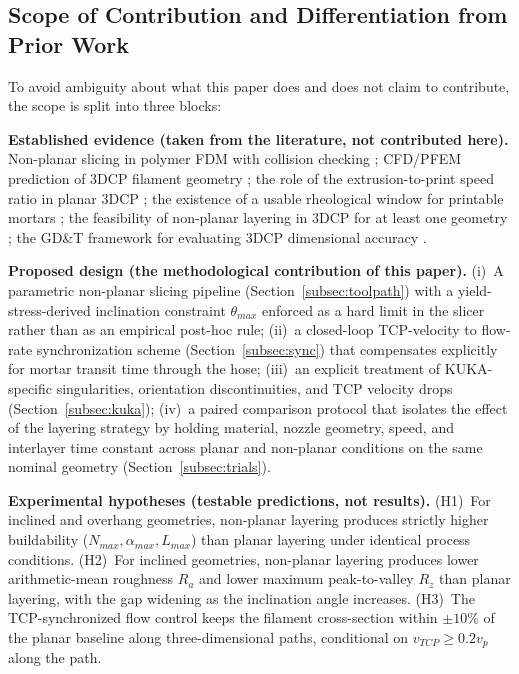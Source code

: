 \documentclass[conference]{IEEEtran}
\begin{document}
\subsection{Scope of Contribution and Differentiation from Prior Work}
\label{subsec:scope}

To avoid ambiguity about what this paper does and does not claim to contribute, the scope is split into three blocks:

\textbf{Established evidence (taken from the literature, not contributed here).} Non-planar slicing in polymer FDM with collision checking \cite{ahlers_3d_2019}; CFD/PFEM prediction of 3DCP filament geometry \cite{COMMINAL2020106256, reinold_extrusion_2022}; the role of the extrusion-to-print speed ratio in planar 3DCP \cite{foteinopoulos_cement-based_2020}; the existence of a usable rheological window for printable mortars \cite{bos_juxtaposing_2021, bao_testing_2024}; the feasibility of non-planar layering in 3DCP for at least one geometry \cite{vele_enhancing_2024}; the GD\&T framework for evaluating 3DCP dimensional accuracy \cite{xu_inspecting_2020}.

\textbf{Proposed design (the methodological contribution of this paper).} (i)~A parametric non-planar slicing pipeline (Section~\ref{subsec:toolpath}) with a yield-stress-derived inclination constraint $\theta_{max}$ enforced as a hard limit in the slicer rather than as an empirical post-hoc rule; (ii)~a closed-loop TCP-velocity to flow-rate synchronization scheme (Section~\ref{subsec:sync}) that compensates explicitly for mortar transit time through the hose; (iii)~an explicit treatment of KUKA-specific singularities, orientation discontinuities, and TCP velocity drops (Section~\ref{subsec:kuka}); (iv)~a paired comparison protocol that isolates the effect of the layering strategy by holding material, nozzle geometry, speed, and interlayer time constant across planar and non-planar conditions on the same nominal geometry (Section~\ref{subsec:trials}).

\textbf{Experimental hypotheses (testable predictions, not results).} (H1)~For inclined and overhang geometries, non-planar layering produces strictly higher buildability ($N_{max}, \alpha_{max}, L_{max}$) than planar layering under identical process conditions. (H2)~For inclined geometries, non-planar layering produces lower arithmetic-mean roughness $R_a$ and lower maximum peak-to-valley $R_z$ than planar layering, with the gap widening as the inclination angle increases. (H3)~The TCP-synchronized flow control keeps the filament cross-section within $\pm 10\%$ of the planar baseline along three-dimensional paths, conditional on $v_{TCP} \geq 0.2 v_p$ along the path.
\end{document}
